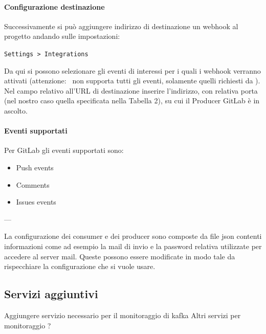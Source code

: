 		\paragraph{Configurazione destinazione}
		Successivamente si può aggiungere indirizzo di destinazione un webhook al progetto andando sulle impostazioni:
		\begin{center}
			\texttt{Settings > Integrations}
		\end{center}
		Da qui si possono selezionare gli eventi di interessi per i quali i webhook verranno attivati (attenzione: \progetto~non supporta tutti gli eventi, solamente quelli richiesti da \II).
		Nel campo relativo all'URL di destinazione inserire l'indirizzo, con relativa porta (nel nostro caso quella specificata nella Tabella 2), su cui il Producer GitLab è in ascolto.


		\paragraph{Eventi supportati}
		Per GitLab gli eventi supportati sono:
		\begin{itemize}
			\item Push events
			\item Comments
			\item Issues events
		\end{itemize}


---


	La configurazione dei consumer e dei producer sono composte da file json contenti informazioni come ad esempio la mail di invio e la password relativa utilizzate per accedere al server mail.
	Queste possono essere modificate in modo tale da rispecchiare la configurazione che si vuole usare.

\subsection{Servizi aggiuntivi}
Aggiungere servizio necessario per il monitoraggio di kafka
Altri servizi per monitoraggio ?
